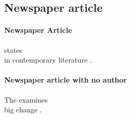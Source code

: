 \documentclass[a4paper,australian,oneside,12pt,footlines=3]{scrbook}%
\theoremstyle{remark}
\begin{document}
\begin{refsection}
\section{Newspaper article}
\paragraph{Newspaper Article}
\textcite{Westwood2014} states\textelp{}\\
\textelp{}in contemporary literature \parencite{Westwood2014}.

\paragraph{Newspaper article with no author}
The \textcite{AFR2012} examines\textelp{}\\
\textelp{}big change \parencite{AFR2012}.
\printbibliography[heading=subbibliography]
\end{refsection}
\end{document}
